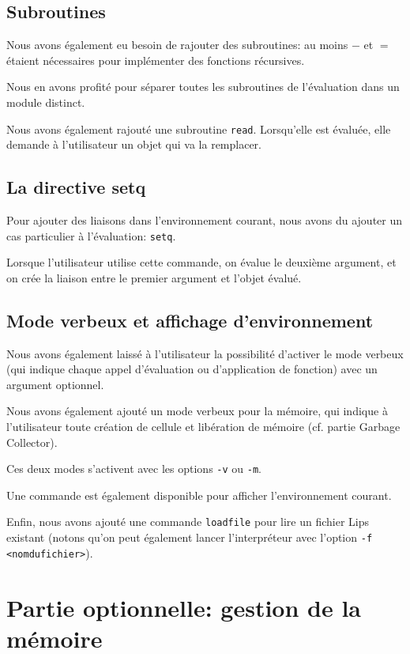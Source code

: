 \documentclass[12pt]{article}
\def\code #1{\lstinline{#1}}
\begin{document}
\subsection{Subroutines}

Nous avons également eu besoin de rajouter des subroutines: au moins $-$ et $=$ étaient nécessaires pour implémenter des fonctions récursives.

Nous en avons profité pour séparer toutes les subroutines de l'évaluation dans un module distinct.

Nous avons également rajouté une subroutine \code{read}. Lorsqu'elle est évaluée, elle demande à l'utilisateur un objet qui va la remplacer.

\subsection{La directive setq}

Pour ajouter des liaisons dans l'environnement courant, nous avons du ajouter un cas particulier à l'évaluation: \code{setq}.

Lorsque l'utilisateur utilise cette commande, on évalue le deuxième argument, et on crée la liaison entre le premier argument et l'objet évalué.


\subsection{Mode verbeux et affichage d'environnement}

Nous avons également laissé à l'utilisateur la possibilité d'activer le mode verbeux (qui indique chaque appel d'évaluation ou d'application de fonction) avec un argument optionnel.

Nous avons également ajouté un mode verbeux pour la mémoire, qui indique à l'utilisateur toute création de cellule et libération de mémoire (cf. partie Garbage Collector).

Ces deux modes s'activent avec les options \code{-v} ou \code{-m}.

Une commande est également disponible pour afficher l'environnement courant.

Enfin, nous avons ajouté une commande \code{loadfile} pour lire un fichier Lips existant (notons qu'on peut également lancer l'interpréteur avec l'option \code{-f <nomdufichier>}).


\section{Partie optionnelle: gestion de la mémoire}
\end{document}

